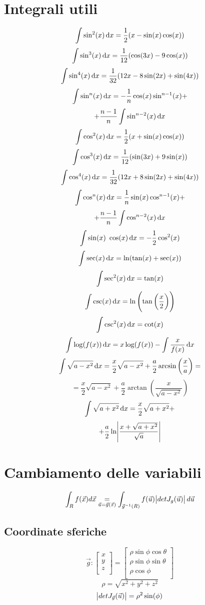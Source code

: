 \documentclass[a4paper,portrait,columns=3,5pt]{cheatsheet}
\begin{document}
\section{Integrali utili}
$$ \int \sin^2(x) \dif x = \frac{1}{2} (x - \sin(x) \cos(x)) $$
$$ \int \sin^3(x) \dif x = \frac{1}{12} (\cos(3x)-9\cos(x)) $$
$$ \int \sin^4(x) \dif x = \frac{1}{32} (12x - 8\sin(2x)+\sin(4x)) $$
$$ \int \sin^n(x) \dif x = -\frac{1}{n} \cos(x) \sin^{n-1}(x) + $$ 
$$ + \frac{n-1}{n} \int \sin^{n-2}(x) \dif x $$
$$ \int \cos^2(x) \dif x = \frac{1}{2} (x + \sin(x)\cos(x)) $$
$$ \int \cos^3(x) \dif x = \frac{1}{12} (\sin(3x) + 9\sin(x))$$
$$ \int \cos^4(x) \dif x = \frac{1}{32} (12 x + 8\sin(2x)+\sin(4x))$$
$$ \int \cos^n(x) \dif x = \frac{1}{n} \sin(x) \cos^{n-1}(x) + $$
$$ + \frac{n-1}{n} \int \cos^{n-2}(x) \dif x $$
$$ \int \sin(x) ~ \cos(x) \dif x = -\frac{1}{2} \cos^2(x) $$ 
$$ \int \sec(x) \dif x = \ln (\tan(x) + \sec(x)) $$
$$ \int \sec^2(x) \dif x = \tan(x) $$
$$ \int \csc (x) \dif x = \ln \left( \tan\left(\frac{x}{2}\right)\right)$$
$$ \int \csc^2(x) \dif x = \cot(x) $$
$$ \int \log(f(x)) \dif x = x \log (f(x)) - \int \frac{x}{f(x)} \dif x $$
$$ \int \sqrt{a - x^2} \dif x = \frac{x}{2} \sqrt{a - x^2} + \frac{a}{2} \arcsin \left(\frac {x}{a}\right) = $$
$$ =  \frac{x}{2} \sqrt{a - x^2} + \frac{a}{2} \arctan \left(\frac{x}{\sqrt{a-x^2}}\right) $$
$$ \int \sqrt{a + x^2} \dif x =  \frac{x}{2} \sqrt{a + x^2} + $$ 
$$ + \frac{a}{2} \ln \abs{\frac{x + \sqrt{a+x^2}}{\sqrt{a}}} $$
\section{Cambiamento delle variabili}
\begin{equation*}
	\int_R f(\vec {x}) d\vec{x} \underset{{\vec{u} = \vec{g} (\vec{x})}}{=} \int_{\vec{g}^{-1}(R)} f(\vec {u}) \abs{det J_g(\vec u)} d\vec{u}
\end{equation*}

\subsection{Coordinate sferiche}
\begin{equation*}
	\vec{g} :
	\begin{bmatrix}
		x \\
		y \\
		z \\
	\end{bmatrix} =
	\begin{bmatrix}
		\rho \sin \phi \cos \theta \\
		\rho \sin \phi \sin \theta \\
		\rho \cos \phi             \\
	\end{bmatrix}
\end{equation*}
\begin{equation*}
	\rho = \sqrt{x^2 + y^2 + z^2}
\end{equation*}
\begin{equation*}
	\abs{detJ_{\vec{g}}(\vec{u})} = \rho^2 \sin(\phi)
\end{equation*}
\end{document}
